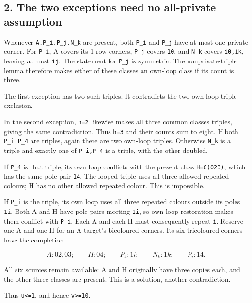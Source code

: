 \documentclass[
  10pt,
]{article}
\begin{document}
\hypertarget{the-two-exceptions-need-no-all-private-assumption}{%
\subsection*{2. The two exceptions need no all-private
assumption}\label{the-two-exceptions-need-no-all-private-assumption}}

Whenever \texttt{A,P\_i,P\_j,N\_k} are present, both \texttt{P\_i} and
\texttt{P\_j} have at most one private corner. For \texttt{P\_i}, A
covers its 1-row corners, \texttt{P\_j} covers \texttt{10}, and
\texttt{N\_k} covers \texttt{i0,ik}, leaving at most \texttt{ij}. The
statement for \texttt{P\_j} is symmetric. The nonprivate-triple lemma
therefore makes either of these classes an own-loop class if its count
is three.

The first exception has two such triples. It contradicts the
two-own-loop-triple exclusion.

In the second exception, \texttt{h=2} likewise makes all three common
classes triples, giving the same contradiction. Thus \texttt{h=3} and
their counts sum to eight. If both \texttt{P\_i,P\_4} are triples, again
there are two own-loop triples. Otherwise \texttt{N\_k} is a triple and
exactly one of \texttt{P\_i,P\_4} is a triple, with the other doubled.

If \texttt{P\_4} is that triple, its own loop conflicts with the present
class \texttt{H=C(023)}, which has the same pole pair \texttt{14}. The
looped triple uses all three allowed repeated colours; H has no other
allowed repeated colour. This is impossible.

If \texttt{P\_i} is the triple, its own loop uses all three repeated
colours outside its poles \texttt{1i}. Both A and H have pole pairs
meeting \texttt{1i}, so own-loop restoration makes them conflict with
\texttt{P\_i}. Each A and each H must consequently repeat \texttt{i}.
Reserve one A and one H for an A target's bicoloured corners. Its six
tricoloured corners have the completion

\[
 A:02,03;\qquad H:04;\qquad P_4:1i;\qquad
 N_k:1k;\qquad P_i:14.
\]

All six sources remain available: A and H originally have three copies
each, and the other three classes are present. This is a solution,
another contradiction.

Thus \texttt{u\textless{}=1}, and hence \texttt{v\textgreater{}=10}.
\end{document}
